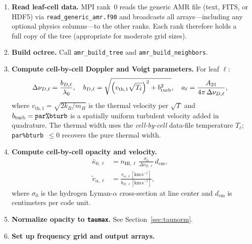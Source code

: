 \documentclass[english,a4paper]{my_memo}
\begin{document}
\begin{enumerate}
  \item \textbf{Read leaf-cell data.}  MPI rank~0 reads the generic AMR file
        (text, FITS, or HDF5) via \texttt{read\_generic\_amr.f90} and broadcasts
        all arrays---including any optional physics columns---to the other ranks.
        Each rank therefore holds a full copy of the tree (appropriate for
        moderate grid sizes).

  \item \textbf{Build octree.}  Call \texttt{amr\_build\_tree} and
        \texttt{amr\_build\_neighbors}.

  \item \textbf{Compute cell-by-cell Doppler and Voigt parameters.}  For leaf $\ell$:
        \begin{equation}
          \Delta\nu_{D,\ell} = \frac{b_{D,\ell}}{\lambda_0},
          \quad
          b_{D,\ell} = \sqrt{\left(v_{\mathrm{th},1}\sqrt{T_\ell}\right)^2 + b_{\rm turb}^2},
          \quad
          a_\ell = \frac{A_{21}}{4\pi\,\Delta\nu_{D,\ell}},
        \end{equation}
        where $v_{\mathrm{th},1} = \sqrt{2k_B/m_H}$ is the thermal velocity per
        $\sqrt{T}$ and $b_{\rm turb} = \texttt{par\%bturb}$ is a spatially uniform
        turbulent velocity added in quadrature.  The thermal width uses the
        \emph{cell-by-cell} data-file temperature $T_\ell$; \texttt{par\%bturb}~$\le 0$
        recovers the pure thermal width.

  \item \textbf{Compute cell-by-cell opacity and velocity.}
        \begin{align}
          \bar\kappa_{0,\ell} &= n_{\mathrm{HI},\ell}\,\frac{\sigma_0}{\Delta\nu_{D,\ell}}\,d_\mathrm{cm}, \\
          \tilde{v}_{\alpha,\ell} &= \frac{v_{\alpha,\ell}[\mathrm{km\,s}^{-1}]}{b_{D,\ell}[\mathrm{km\,s}^{-1}]},
        \end{align}
        where $\sigma_0$ is the hydrogen Lyman-$\alpha$ cross-section at line
        center and $d_\mathrm{cm}$ is centimeters per code unit.

  \item \textbf{Normalize opacity to \texttt{taumax}.}  See Section~\ref{sec:taunorm}.

  \item \textbf{Set up frequency grid and output arrays.}
\end{enumerate}
\end{document}
